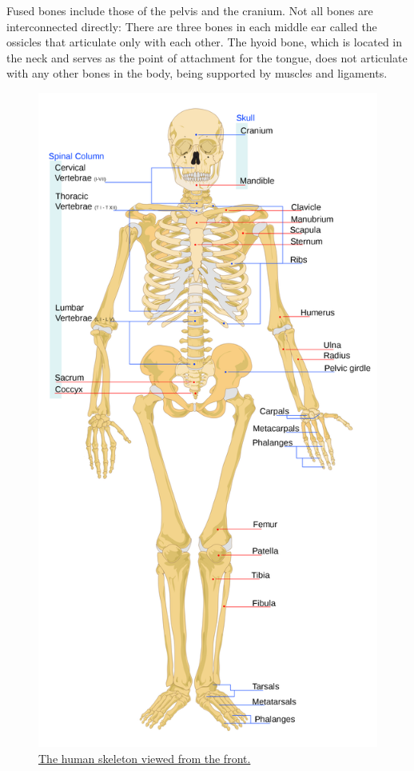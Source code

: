 Fused bones include those of the pelvis and the cranium. Not all bones are interconnected directly: There are three bones in each middle ear called the ossicles that articulate only with each other. The hyoid bone, which is located in the neck and serves as the point of attachment for the tongue, does not articulate with any other bones in the body, being supported by muscles and ligaments.



\begin{figure}

{\centering \includegraphics[width=0.7\linewidth]{./figures/locomotion/Human_skeleton_front_en} 

}

\caption{\href{https://commons.wikimedia.org/wiki/File:Human_skeleton_front_en.svg}{The human skeleton viewed from the front.}}\label{fig:humanskeletonfront}
\end{figure}

